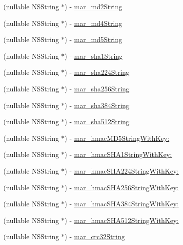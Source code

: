 \begin{Indent}
{ }\begin{DoxyCompactItemize}
\item 
(nullable N\+S\+String $\ast$) -\/ \hyperlink{category_n_s_string_07_m_a_r_e_x_08_a50229cbd215c513804ed6f0348ba848f}{mar\+\_\+md2\+String}
\item 
(nullable N\+S\+String $\ast$) -\/ \hyperlink{category_n_s_string_07_m_a_r_e_x_08_a1a8dd765812302b91a2fdc07bbf6b7fb}{mar\+\_\+md4\+String}
\item 
(nullable N\+S\+String $\ast$) -\/ \hyperlink{category_n_s_string_07_m_a_r_e_x_08_a532894e54a02f122a642dbc9893ecbc0}{mar\+\_\+md5\+String}
\item 
(nullable N\+S\+String $\ast$) -\/ \hyperlink{category_n_s_string_07_m_a_r_e_x_08_ac218403273e8a33f3a03bd29f0195008}{mar\+\_\+sha1\+String}
\item 
(nullable N\+S\+String $\ast$) -\/ \hyperlink{category_n_s_string_07_m_a_r_e_x_08_a4315abce1fc3154dc0f8f413bf98ac9b}{mar\+\_\+sha224\+String}
\item 
(nullable N\+S\+String $\ast$) -\/ \hyperlink{category_n_s_string_07_m_a_r_e_x_08_afe4acbd5fb640812b3df67185365d708}{mar\+\_\+sha256\+String}
\item 
(nullable N\+S\+String $\ast$) -\/ \hyperlink{category_n_s_string_07_m_a_r_e_x_08_a6613780a55a0b2ba220b8f682c4ff5b6}{mar\+\_\+sha384\+String}
\item 
(nullable N\+S\+String $\ast$) -\/ \hyperlink{category_n_s_string_07_m_a_r_e_x_08_ad5cd55b4f42a442504eb26677972b098}{mar\+\_\+sha512\+String}
\item 
(nullable N\+S\+String $\ast$) -\/ \hyperlink{category_n_s_string_07_m_a_r_e_x_08_a1f14a1aa797a51ee147c72dcdbe00c40}{mar\+\_\+hmac\+M\+D5\+String\+With\+Key\+:}
\item 
(nullable N\+S\+String $\ast$) -\/ \hyperlink{category_n_s_string_07_m_a_r_e_x_08_aa807fe24854e368144c8bd1068326a85}{mar\+\_\+hmac\+S\+H\+A1\+String\+With\+Key\+:}
\item 
(nullable N\+S\+String $\ast$) -\/ \hyperlink{category_n_s_string_07_m_a_r_e_x_08_adb83ac231d3d660eae3a09e256ac896b}{mar\+\_\+hmac\+S\+H\+A224\+String\+With\+Key\+:}
\item 
(nullable N\+S\+String $\ast$) -\/ \hyperlink{category_n_s_string_07_m_a_r_e_x_08_a4d10fec022578f038581721f519e0c66}{mar\+\_\+hmac\+S\+H\+A256\+String\+With\+Key\+:}
\item 
(nullable N\+S\+String $\ast$) -\/ \hyperlink{category_n_s_string_07_m_a_r_e_x_08_ae10b061e5a671bd2d401ea96d685edcc}{mar\+\_\+hmac\+S\+H\+A384\+String\+With\+Key\+:}
\item 
(nullable N\+S\+String $\ast$) -\/ \hyperlink{category_n_s_string_07_m_a_r_e_x_08_acf50b67a5e5a8a6065546a8e115a9d9e}{mar\+\_\+hmac\+S\+H\+A512\+String\+With\+Key\+:}
\item 
(nullable N\+S\+String $\ast$) -\/ \hyperlink{category_n_s_string_07_m_a_r_e_x_08_a44174c0816e4943e9908ba0d231aac72}{mar\+\_\+crc32\+String}
\end{DoxyCompactItemize}
\end{Indent}
